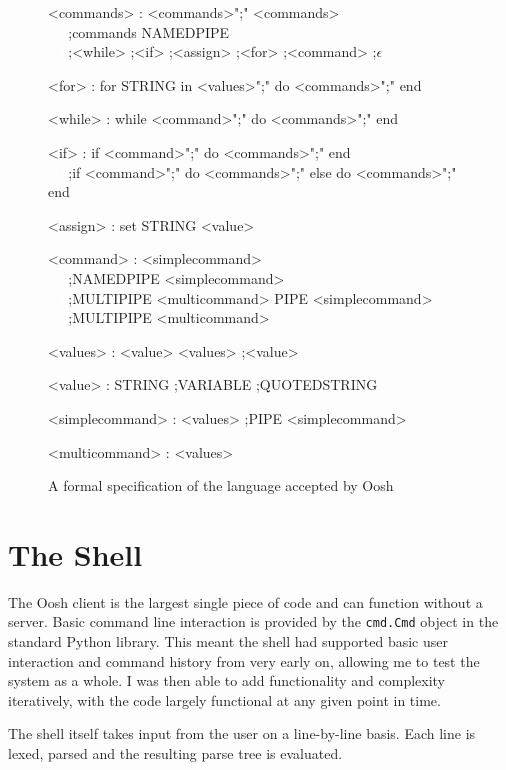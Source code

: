 \documentclass[12pt,twoside,notitlepage]{report}
\begin{document}
\begin{figure}[h]
\caption{A formal specification of the language accepted by Oosh}
\begin{grammar}
<commands> : <commands>";" <commands>\\
\textcolor{white}{tab};commands NAMEDPIPE\\
\textcolor{white}{tab};<while> ;<if> ;<assign> ;<for> ;<command> ;$\epsilon$

<for> : for STRING in <values>";" do <commands>";" end

<while> : while <command>";" do <commands>";" end

<if> : if <command>";" do <commands>";" end\\
\textcolor{white}{tab};if <command>";" do <commands>";" else do <commands>";" end

<assign> : set STRING <value>

<command> : <simplecommand>\\
\textcolor{white}{tab};NAMEDPIPE <simplecommand>\\
\textcolor{white}{tab};MULTIPIPE <multicommand> PIPE <simplecommand>\\
\textcolor{white}{tab};MULTIPIPE <multicommand>

<values> : <value> <values> ;<value>

<value> : STRING ;VARIABLE ;QUOTEDSTRING

<simplecommand> : <values>
;PIPE <simplecommand>
    
<multicommand> : <values>
\end{grammar}
\end{figure}

\section{The Shell}
The Oosh client is the largest single piece of code and can function without a
server. Basic command line interaction is provided by the {\tt cmd.Cmd} object
in the standard Python library. This meant the shell had supported basic user
interaction and command history from very early on, allowing me to test the
system as a whole. I was then able to add functionality and complexity
iteratively, with the code largely functional at any given point in time.

The shell itself takes input from the user on a line-by-line basis. Each line is
lexed, parsed and the resulting parse tree is evaluated.
\end{document}
